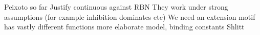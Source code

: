 \documentclass[../main.tex]{subfiles}
\begin{document}
Peixoto so far
Justify continuous against RBN
They work under strong assumptions (for example inhibition dominates etc) \cite{}
We need an extension
motif has vastly different functions \cite{ingram2006network}
more elaborate model, binding constants	\cite{ingram2006network}
Shlitt
\end{document}
